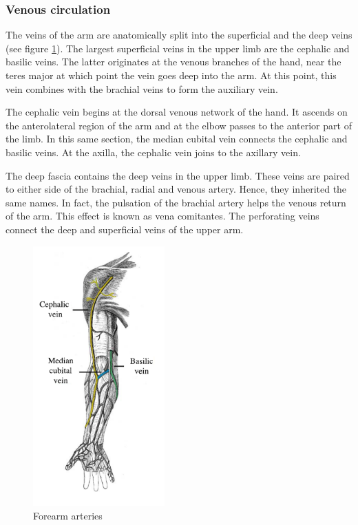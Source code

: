 \subsubsection{Venous circulation}
The veins of the arm are anatomically split into the superficial and the deep veins (see figure \ref{fig:arm veind}). The largest superficial veins in the upper limb are the cephalic and basilic veins. The latter originates at the venous branches of the hand, near the teres major at which point the vein goes deep into the arm. At this point, this vein combines with the brachial veins to form the auxiliary vein. 

The cephalic vein begins at the dorsal venous network of the hand. It ascends on the anterolateral region of the arm and at the elbow passes to the anterior part of the limb. In this same section, the median cubital vein connects the cephalic and basilic veins. At the axilla, the cephalic vein joins to the axillary vein. 

The deep fascia contains the deep veins in the upper limb. These veins are paired to either side of the brachial, radial and venous artery. Hence, they inherited the same names.  In fact, the pulsation of the brachial artery helps the venous return of the arm. This effect is known as vena comitantes. The perforating veins connect the deep and superficial veins of the upper arm. 

\begin{figure}[!htpb]
	\centering
	\includegraphics[height=10cm,keepaspectratio]{figure21}
	\caption{Forearm arteries}
	\label{fig:arm veind}
\end{figure} 


